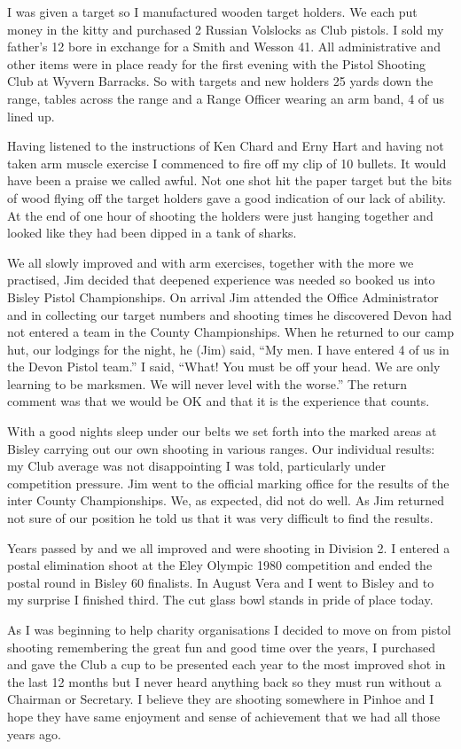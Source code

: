 I was given a target so I manufactured wooden target holders. We each put money
in the kitty and purchased 2 Russian Volslocks as Club pistols. I sold my
father's 12 bore in exchange for a Smith and Wesson 41. All administrative and
other items were in place ready for the first evening with the Pistol Shooting
Club at Wyvern Barracks. So with targets and new holders 25 yards down the
range, tables across the range and a Range Officer wearing an arm band, 4 of us
lined up.

Having listened to the instructions of Ken Chard and Erny Hart and having not
taken arm muscle exercise I commenced to fire off my clip of 10 bullets. It
would have been a praise we called awful. Not one shot hit the paper target
but the bits of wood flying off the target holders gave a good indication of
our lack of ability. At the end of one hour of shooting the holders were just
hanging together and looked like they had been dipped in a tank of sharks.

We all slowly improved and with arm exercises, together with the more we
practised, Jim decided that deepened experience was needed so booked us into
Bisley Pistol Championships. On arrival Jim attended the Office Administrator
and in collecting our target numbers and shooting times he discovered Devon had
not entered a team in the County Championships. When he returned to our camp
hut, our lodgings for the night, he (Jim) said, ``My men. I have entered 4 of
us in the Devon Pistol team.'' I said, ``What! You must be off your head. We
are only learning to be marksmen. We will never level with the worse.'' The
return comment was that we would be OK and that it is the experience that
counts.

With a good nights sleep under our belts we set forth into the marked areas at
Bisley carrying out our own shooting in various ranges. Our individual
results: my Club average was not disappointing I was told, particularly under
competition pressure. Jim went to the official marking office for the results
of the inter County Championships. We, as expected, did not do well. As Jim
returned not sure of our position he told us that it was very difficult to find
the results.

Years passed by and we all improved and were shooting in Division 2. I entered
a postal elimination shoot at the Eley Olympic 1980 competition and ended the
postal round in Bisley 60 finalists. In August Vera and I went to Bisley and
to my surprise I finished third. The cut glass bowl stands in pride of place
today.

As I was beginning to help charity organisations I decided to move on from
pistol shooting remembering the great fun and good time over the years, I
purchased and gave the Club a cup to be presented each year to the most
improved shot in the last 12 months but I never heard anything back so they
must run without a Chairman or Secretary. I believe they are shooting
somewhere in Pinhoe and I hope they have same enjoyment and sense of
achievement that we had all those years ago.
